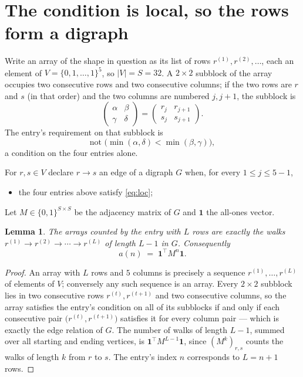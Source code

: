 \documentclass[11pt,a4paper]{article}
\theoremstyle{plain}
\newtheorem{lemma}[theorem]{Lemma}
\theoremstyle{definition}
\begin{document}
\section{The condition is local, so the rows form a digraph}

Write an array of the shape in question as its list of rows
$r^{(1)},r^{(2)},\dots$, each an element of
$V=\{0,1,\dots,1\}^{5}$, so $|V|=S=32$. A $2\times2$ subblock of the array
occupies two consecutive rows and two consecutive columns; if the two rows are $r$
and $s$ (in that order) and the two columns are numbered $j,j+1$,
the subblock is
\[
\begin{pmatrix}\alpha&\beta\\\gamma&\delta\end{pmatrix}=\begin{pmatrix}r_j&r_{j+1}\\s_j&s_{j+1}\end{pmatrix}.
\]
The entry's requirement on that subblock is
\begin{equation}\label{eq:loc}
\text{not }\bigl(\min(\alpha,\delta)<\min(\beta,\gamma)\bigr),
\end{equation}
a condition on the four entries alone.

For $r,s\in V$ declare $r\to s$ an edge of a digraph $G$ when, for every
$1\le j\le 5-1$,
\begin{itemize}
\item the four entries above satisfy \eqref{eq:loc};

\end{itemize}
Let $M\in\{0,1\}^{S\times S}$ be the adjacency matrix of $G$ and $\mathbf{1}$ the
all-ones vector.

\begin{lemma}\label{lem:walk}
The arrays counted by the entry with $L$ rows are exactly the walks
$r^{(1)}\to r^{(2)}\to\cdots\to r^{(L)}$ of length $L-1$ in $G$. Consequently
\[
a(n)\;=\;\mathbf{1}^{\!\top}M^{n}\mathbf{1} .
\]
\end{lemma}

\begin{proof}
An array with $L$ rows and $5$ columns is precisely a sequence
$r^{(1)},\dots,r^{(L)}$ of elements of $V$; conversely any such sequence is an array.
Every $2\times2$ subblock lies in two consecutive rows $r^{(t)},r^{(t+1)}$ and two
consecutive columns, so the array satisfies the entry's condition on all of its subblocks
if and only if each consecutive pair $\bigl(r^{(t)},r^{(t+1)}\bigr)$ satisfies it for
every column pair --- which is exactly the edge relation of $G$. The number of walks of
length $L-1$, summed over all starting and ending vertices, is
$\mathbf{1}^{\!\top}M^{L-1}\mathbf{1}$, since $(M^{k})_{r,s}$ counts the walks of
length $k$ from $r$ to $s$. The entry's index $n$ corresponds to $L=n+1$ rows.
\end{proof}
\end{document}
